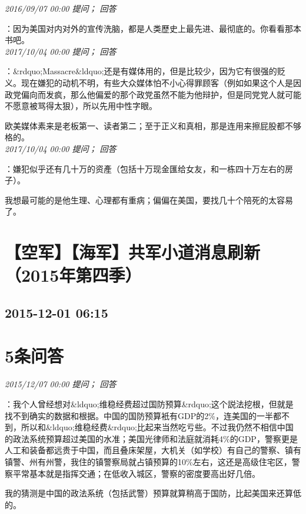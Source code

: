 \documentclass[twocolumn]{ctexart}
\begin{document}
\textit{\hfill\noindent\small 2016/09/07 00:00 提问； 回答}

：因为美国对内对外的宣传洗脑，都是人类歷史上最先进、最彻底的。你看看那本书吧。\\

\textit{\hfill\noindent\small 2017/10/04 00:00 提问； 回答}

：\&rdquo;Massacre\&ldquo;还是有媒体用的，但是比较少，因为它有很强的贬义。现在嫌犯的动机不明，有些大众媒体怕不小心得罪顾客（例如如果这个人是因政党偏向而发疯，那么他偏爱的那个政党虽然不能为他辩护，但是同党党人就可能不愿意被骂得太狠），所以先用中性字眼。

欧美媒体素来是老板第一、读者第二；至于正义和真相，那是连用来擦屁股都不够格的。\\

\textit{\hfill\noindent\small 2017/10/04 00:00 提问； 回答}

：嫌犯似乎还有几十万的资產（包括十万现金匯给女友，和一栋四十万左右的房子）。

我想最可能的是他生理、心理都有重病；偏偏在美国，要找几十个陪死的太容易了。\\


\section{【空军】【海军】共军小道消息刷新（2015年第四季）}
\subsection{2015-12-01 06:15}


\section{5条问答}

\textit{\hfill\noindent\small 2015/12/07 00:00 提问； 回答}

：我个人曾经想对\&ldquo;维稳经费超过国防预算\&rdquo;这个説法挖根，但就是找不到确实的数据和根据。中国的国防预算衹有GDP的2\%，连美国的一半都不到，所以和\&ldquo;维稳经费\&rdquo;比起来当然吃亏些。不过我仍然不相信中国的政法系统预算超过美国的水准；美国光律师和法庭就消耗4\%的GDP，警察更是人工和装备都远贵于中国，而且叠床架屋，大机关（如学校）有自己的警察、镇有镇警、州有州警，我住的镇警察局就占镇预算的10\%左右，这还是高级住宅区，警察平常基本就是指挥交通；在低收入城区，警察的密度要高出好几倍。

我的猜测是中国的政法系统（包括武警）预算就算稍高于国防，比起美国来还算低的。
\end{document}
